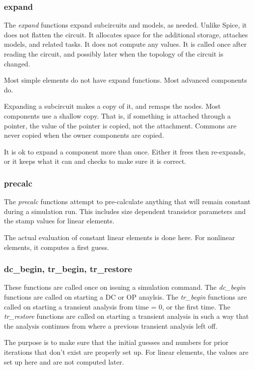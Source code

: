 \subsubsection{expand}

The {\em expand} functions expand subcircuits and models, as needed.
Unlike Spice, it does not flatten the circuit.  It allocates space for
the additional storage, attaches models, and related tasks.  It does
not compute any values.  It is called once after reading the circuit,
and possibly later when the topology of the circuit is changed.

Most simple elements do not have expand functions.  Most advanced
components do.

Expanding a subcircuit makes a copy of it, and remaps the nodes.  Most
components use a shallow copy.  That is, if something is attached
through a pointer, the value of the pointer is copied, not the
attachment.  Commons are never copied when the owner components are
copied. 

It is ok to expand a component more than once.  Either it frees then
re-expands, or it keeps what it can and checks to make sure it is
correct. 

\subsubsection{precalc}

The {\em precalc} functions attempt to pre-calculate anything that
will remain constant during a simulation run.  This includes size
dependent transistor parameters and the stamp values for linear
elements.

The actual evaluation of constant linear elements is done here.  For
nonlinear elements, it computes a first guess.

\subsubsection{dc\_begin, tr\_begin, tr\_restore}

These functions are called once on issuing a simulation command.  The
{\em dc\_begin} functions are called on starting a DC or OP anaylsis.
The {\em tr\_begin} functions are called on starting a transient
analysis from time = 0, or the first time.  The {\em tr\_restore}
functions are called on starting a transient analysis in such a way
that the analysis continues from where a previous transient analysis
left off.

The purpose is to make sure that the initial guesses and numbers for
prior iterations that don't exist are properly set up.  For linear
elements, the values are set up here and are not computed later.

